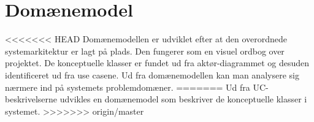 \section{Domænemodel}
<<<<<<< HEAD
Domænemodellen er udviklet efter at den overordnede systemarkitektur er lagt på plads. Den fungerer som en visuel ordbog over projektet. De konceptuelle klasser er fundet ud fra aktør-diagrammet og desuden identificeret ud fra use casene. Ud fra domænemodellen kan man analysere sig nærmere ind på systemets problemdomæner.
=======
\label{sec:Domainmodel}
Ud fra UC-beskrivelserne udvikles en domænemodel som beskriver de konceptuelle klasser i systemet.
>>>>>>> origin/master

